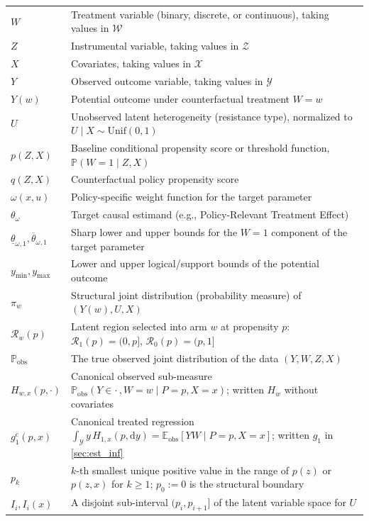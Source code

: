 {\begin{longtable}{lp{\dimexpr\textwidth-5.6cm\relax}}
$W$ & Treatment variable (binary, discrete, or continuous), taking values in $\mathcal{W}$ \\
$Z$ & Instrumental variable, taking values in $\mathcal{Z}$ \\
$X$ & Covariates, taking values in $\mathcal{X}$ \\
$Y$ & Observed outcome variable, taking values in $\mathcal{Y}$ \\
$Y(w)$ & Potential outcome under counterfactual treatment $W=w$ \\
$U$ & Unobserved latent heterogeneity (resistance type), normalized to $U\mid X \sim \text{Unif}(0,1)$ \\
$p(Z,X)$ & Baseline conditional propensity score or threshold function, $\mathbb{P}(W=1\mid Z,X)$ \\
$q(Z,X)$ & Counterfactual policy propensity score \\
$\omega(x,u)$ & Policy-specific weight function for the target parameter \\
$\theta_{\omega}$ & Target causal estimand (e.g., Policy-Relevant Treatment Effect) \\
$\underline{\theta}_{\omega,1}, \overline{\theta}_{\omega,1}$ & Sharp lower and upper bounds for the $W=1$ component of the target parameter \\
$y_{\min}, y_{\max}$ & Lower and upper logical/support bounds of the potential outcome \\
$\pi_w$ & Structural joint distribution (probability measure) of $(Y(w), U, X)$ \\
$\mathcal{R}_w(p)$ & Latent region selected into arm $w$ at propensity $p$: $\mathcal{R}_1(p)=(0,p]$, $\mathcal{R}_0(p)=(p,1]$ \\
$\mathbb{P}_{\text{obs}}$ & The true observed joint distribution of the data $(Y, W, Z, X)$ \\
$H_{w,x}(p,\cdot)$ & Canonical observed sub-measure $\mathbb{P}_{\text{obs}}(Y\in\cdot\,,W=w\mid P=p,X=x)$; written $H_w$ without covariates \\
$g_1^{\mathrm{c}}(p,x)$ & Canonical treated regression $\int_{\mathcal{Y}} y\,H_{1,x}(p,\mathrm{d}y)=\mathbb{E}_{\text{obs}}[YW\mid P=p,X=x]$; written $g_1$ in \cref{sec:est_inf} \\
$p_k$ & $k$-th smallest unique positive value in the range of $p(z)$ or $p(z,x)$ for $k\geqslant1$; $p_0:=0$ is the structural boundary \\
$I_i, I_i(x)$ & A disjoint sub-interval $(p_i, p_{i+1}]$ of the latent variable space for $U$ \\

\end{longtable}}
